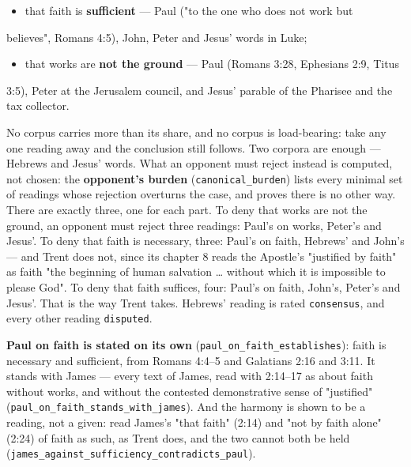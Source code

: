 \documentclass[11pt]{article}
\begin{document}
\begin{itemize}
  \item that faith is \textbf{sufficient} — Paul ("to the one who does not work but
\end{itemize}
  believes", Romans 4:5), John, Peter and Jesus' words in Luke;

\begin{itemize}
  \item that works are \textbf{not the ground} — Paul (Romans 3:28, Ephesians 2:9, Titus
\end{itemize}
  3:5), Peter at the Jerusalem council, and Jesus' parable of the Pharisee and   the tax collector.

No corpus carries more than its share, and no corpus is load-bearing: take any one reading away and the conclusion still follows. Two corpora are enough — Hebrews and Jesus' words. What an opponent must reject instead is computed, not chosen: the \textbf{opponent's burden} (\texttt{canonical\_\allowbreak{}burden}) lists every minimal set of readings whose rejection overturns the case, and proves there is no other way. There are exactly three, one for each part. To deny that works are not the ground, an opponent must reject three readings: Paul's on works, Peter's and Jesus'. To deny that faith is necessary, three: Paul's on faith, Hebrews' and John's — and Trent does not, since its chapter 8 reads the Apostle's "justified by faith" as faith "the beginning of human salvation … without which it is impossible to please God". To deny that faith suffices, four: Paul's on faith, John's, Peter's and Jesus'. That is the way Trent takes. Hebrews' reading is rated \texttt{consensus}, and every other reading \texttt{disputed}.

\textbf{Paul on faith is stated on its own} (\texttt{paul\_\allowbreak{}on\_\allowbreak{}faith\_\allowbreak{}establishes}): faith is necessary and sufficient, from Romans 4:4–5 and Galatians 2:16 and 3:11. It stands with James — every text of James, read with 2:14–17 as about faith without works, and without the contested demonstrative sense of "justified" (\texttt{paul\_\allowbreak{}on\_\allowbreak{}faith\_\allowbreak{}stands\_\allowbreak{}with\_\allowbreak{}james}). And the harmony is shown to be a reading, not a given: read James's "that faith" (2:14) and "not by faith alone" (2:24) of faith as such, as Trent does, and the two cannot both be held (\texttt{james\_\allowbreak{}against\_\allowbreak{}sufficiency\_\allowbreak{}contradicts\_\allowbreak{}paul}).
\end{document}
